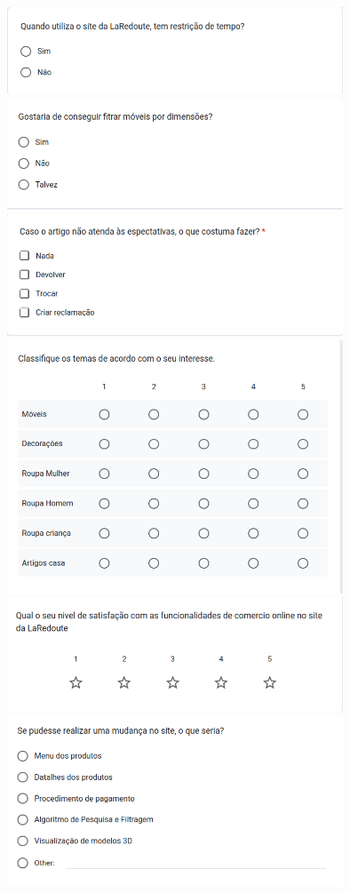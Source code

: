 \documentclass[a4paper,12pt]{article}
\begin{document}
\begin{center}
    \includegraphics[width=0.75\textwidth]{form/11questao_restricaotempo.png}
    \includegraphics[width=0.75\textwidth]{form/12questao_filtrardimensoes.png}
    \includegraphics[width=0.75\textwidth]{form/13questao_expectativas.png}
    \includegraphics[width=0.75\textwidth]{form/14questao_temasinteresse.png}
    \includegraphics[width=0.75\textwidth]{form/15questao_satisfacao.png}
    \includegraphics[width=0.75\textwidth]{form/16questao_mudancasite.png}

\end{center}
\end{document}
